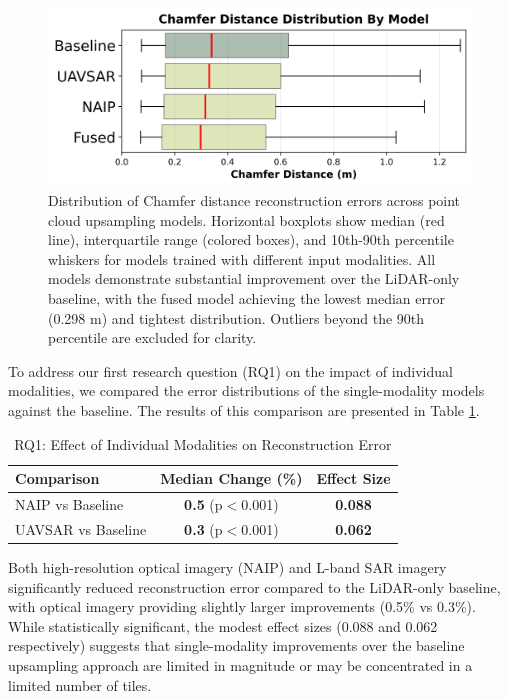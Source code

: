 \documentclass[preprints,article,accept,pdftex,moreauthors]{Definitions/mdpi}
\begin{document}
\begin{figure}
    \centering
    \includegraphics[width=0.75\linewidth]{manuscript//figures/boxplot_by_model.png}
    \caption{Distribution of Chamfer distance reconstruction errors across point cloud upsampling models. Horizontal boxplots show median (red line), interquartile range (colored boxes), and 10th-90th percentile whiskers for models trained with different input modalities. All models demonstrate substantial improvement over the LiDAR-only baseline, with the fused model achieving the lowest median error (0.298 m) and tightest distribution. Outliers beyond the 90th percentile are excluded for clarity.}
    \label{fig:boxplot_model_comparison}
\end{figure}

To address our first research question (RQ1) on the impact of individual modalities, we compared the error distributions of the single-modality models against the baseline. The results of this comparison are presented in Table \ref{tab:rq1_results}.

\begin{table}[htbp]
\centering
\caption{RQ1: Effect of Individual Modalities on Reconstruction Error}
\begin{tabular}{lcc}
\toprule
\textbf{Comparison} & \textbf{Median Change (\%)} & \textbf{Effect Size} \\
\midrule
NAIP vs Baseline & \textbf{0.5} (p$<$0.001) & \textbf{0.088} \\
UAVSAR vs Baseline & \textbf{0.3} (p$<$0.001) & \textbf{0.062} \\
\bottomrule
\end{tabular}
\label{tab:rq1_results}
\end{table}
Both high-resolution optical imagery (NAIP) and L-band SAR imagery significantly reduced reconstruction error compared to the LiDAR-only baseline, with optical imagery providing slightly larger improvements (0.5\% vs 0.3\%). While statistically significant, the modest effect sizes (0.088 and 0.062 respectively) suggests that single-modality improvements over the baseline upsampling approach are limited in magnitude or may be concentrated in a limited number of tiles.
\end{document}
